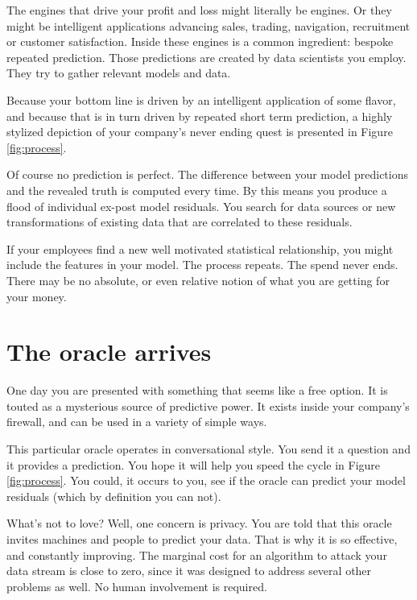 The engines that drive your profit and loss might literally be engines. Or they might be intelligent applications advancing sales, trading, navigation, recruitment or customer satisfaction. Inside these engines is a common ingredient: bespoke repeated prediction. Those predictions are created by data scientists you employ. They try to gather relevant models and data. 

Because your bottom line is driven by an intelligent application of some flavor, and because that is in turn driven by repeated short term prediction, a highly stylized depiction of your company's never ending quest is presented in Figure \ref{fig:process}. 

Of course no prediction is perfect. The difference between your model predictions and the revealed truth is computed every time. By this means you produce a flood of individual ex-post model residuals. You search for 
data sources or new transformations of existing data that are correlated to these residuals.  

If your employees find a new well motivated statistical relationship, you might include the features in your model. The process repeats. The spend never ends. There may be no absolute, or even relative notion of what you are getting for your money. 



\section{The oracle arrives}

One day you are presented with something that seems like a free option. It is touted as a mysterious source of predictive power. It exists inside your company's firewall, and can be used in a variety of simple ways. 

This particular oracle operates in conversational style. You send it a question and it provides a prediction. You hope it will help you speed the cycle in Figure \ref{fig:process}. You could, it occurs to you, see if the oracle can predict your model residuals (which by definition you can not). 

What's not to love? Well, one concern is privacy. You are told that this oracle invites machines and people to predict your data. That is why it is so effective, and constantly improving. The marginal cost for an algorithm to attack your data stream is close to zero, since it was designed to address several other problems as well. No human involvement is required.  

